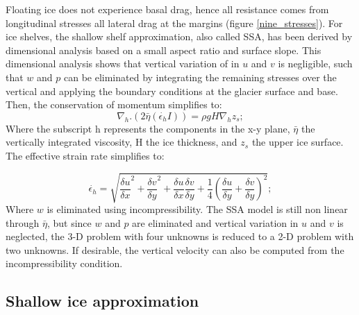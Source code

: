 \documentclass{article}
\begin{document}
Floating ice does not experience basal drag, hence all resistance comes from longitudinal stresses all lateral drag at the margins (figure \ref{nine_stresses}). For ice shelves, the shallow shelf approximation, also called SSA, has been derived by dimensional analysis based on a small aspect ratio and surface slope. This dimensional analysis shows that vertical variation of in $u$ and $v$ is negligible, such that $w$ and $p$ can be eliminated by integrating the remaining stresses over the vertical and applying the boundary conditions at the glacier surface and base. Then, the conservation of momentum simplifies to:
\begin{equation}
	\nabla_h.(2\bar{\eta}(\dot{\epsilon_h}I))=\rho g H \nabla_h z_s;
\end{equation}
Where the subscript h represents the components in the x-y plane, $\bar{\eta}$ the vertically integrated viscosity, H the ice thickness, and $z_s$ the upper ice surface. The effective strain rate simplifies to:

\begin{equation}
	\dot{\epsilon_h}=\sqrt{{\frac{\delta u}{\delta x}}^2+{\frac{\delta v}{\delta y}}^2+\frac{\delta u}{\delta x}\frac{\delta v}{\delta y}+\frac{1}{4}{(\frac{\delta u}{\delta y}+\frac{\delta v}{\delta y})}^2};
\end{equation}
Where $w$ is eliminated using incompressibility. The SSA model is still non linear through $\bar{\eta}$, but since $w$ and $p$ are eliminated and vertical variation in $u$ and $v$ is neglected, the 3-D problem with four unknowns is reduced to a 2-D problem with two unknowns. If desirable, the vertical velocity can also be computed from the incompressibility condition. 

\subsection{Shallow ice approximation}
\end{document}
